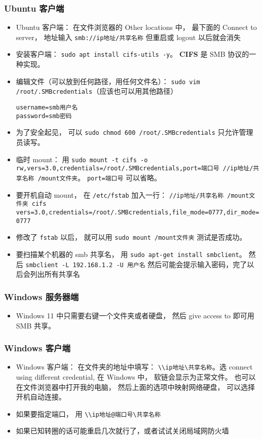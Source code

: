 \subsubsection{Ubuntu 客户端}
\begin{itemize}
\item Ubuntu 客户端： 在文件浏览器的 Other locations 中， 最下面的 Connect to server， 地址输入 \verb`smb://ip地址/共享名称` 但重启或 logout 以后就会消失
\item 安装客户端： \verb`sudo apt install cifs-utils -y`。 \textbf{CIFS} 是 SMB 协议的一种实现。
\item 编辑文件（可以放到任何路径，用任何文件名）： \verb`sudo vim /root/.SMBcredentials`（应该也可以用其他路径）
\begin{lstlisting}[language=none]
username=smb用户名
password=smb密码
\end{lstlisting}
\item 为了安全起见， 可以 \verb`sudo chmod 600 /root/.SMBcredentials` 只允许管理员读写。
\item 临时 mount： 用 \verb`sudo mount -t cifs -o rw,vers=3.0,credentials=/root/.SMBcredentials,port=端口号 //ip地址/共享名称 /mount文件夹`。 \verb`port=端口号` 可以省略。
\item 要开机自动 mount， 在 \verb`/etc/fstab` 加入一行： \verb`//ip地址/共享名称 /mount文件夹 cifs vers=3.0,credentials=/root/.SMBcredentials,file_mode=0777,dir_mode=0777`
\item 修改了 \verb`fstab` 以后， 就可以用 \verb`sudo mount /mount文件夹` 测试是否成功。
\item 要扫描某个机器的 smb 共享名， 用 \verb`sudo apt-get install smbclient`。 然后 \verb`smbclient -L 192.168.1.2 -U 用户名` 然后可能会提示输入密码，完了以后会列出所有共享名
\end{itemize}

\subsubsection{Windows 服务器端}
\begin{itemize}
\item Windows 11 中只需要右键一个文件夹或者硬盘， 然后 give access to 即可用 SMB 共享。
\end{itemize}

\subsubsection{Windows 客户端}
\begin{itemize}
\item Windows 客户端： 在文件夹的地址中填写： \verb`\\ip地址\共享名称`。选 connect using different credential, 在 Windows 中， 软链会显示为正常文件。 也可以在文件浏览器中打开我的电脑， 然后上面的选项中映射网络硬盘， 可以选择开机自动连接。
\item 如果要指定端口， 用 \verb`\\ip地址@端口号\共享名称`
\item 如果已知转圈的话可能重启几次就行了，或者试试关闭局域网防火墙
\end{itemize}

